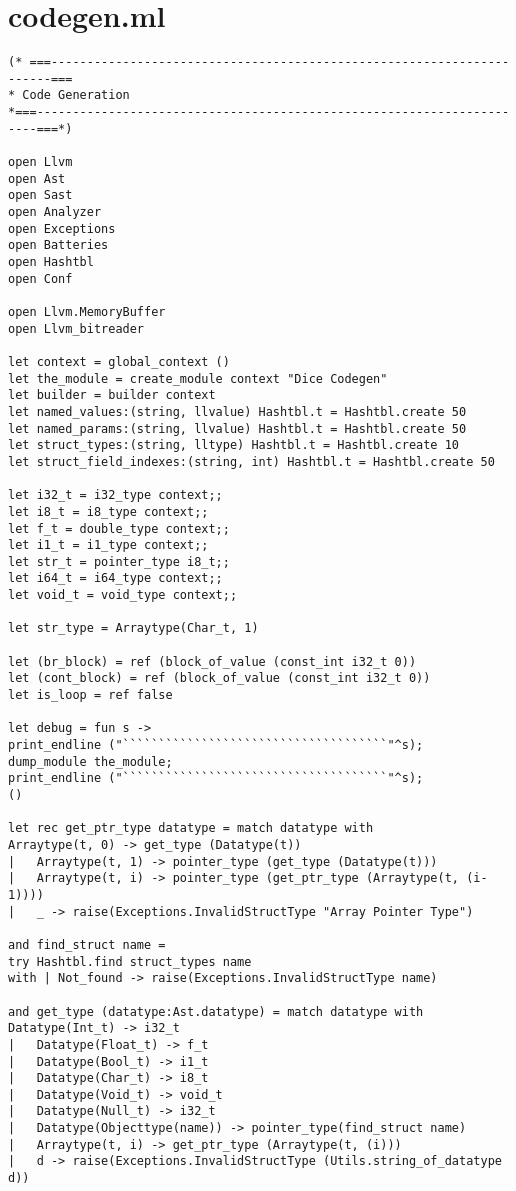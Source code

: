 \section{codegen.ml}
\begin{verbatim}
(* ===----------------------------------------------------------------------===
* Code Generation
*===----------------------------------------------------------------------===*)

open Llvm
open Ast
open Sast
open Analyzer
open Exceptions
open Batteries
open Hashtbl
open Conf

open Llvm.MemoryBuffer
open Llvm_bitreader

let context = global_context ()
let the_module = create_module context "Dice Codegen"
let builder = builder context
let named_values:(string, llvalue) Hashtbl.t = Hashtbl.create 50
let named_params:(string, llvalue) Hashtbl.t = Hashtbl.create 50
let struct_types:(string, lltype) Hashtbl.t = Hashtbl.create 10
let struct_field_indexes:(string, int) Hashtbl.t = Hashtbl.create 50

let i32_t = i32_type context;;
let i8_t = i8_type context;;
let f_t = double_type context;;
let i1_t = i1_type context;;
let str_t = pointer_type i8_t;;
let i64_t = i64_type context;;
let void_t = void_type context;;

let str_type = Arraytype(Char_t, 1)

let (br_block) = ref (block_of_value (const_int i32_t 0))
let (cont_block) = ref (block_of_value (const_int i32_t 0))
let is_loop = ref false

let debug = fun s ->  
print_endline ("`````````````````````````````````````"^s);
dump_module the_module;
print_endline ("`````````````````````````````````````"^s);
()

let rec get_ptr_type datatype = match datatype with
Arraytype(t, 0) -> get_type (Datatype(t))
|	Arraytype(t, 1) -> pointer_type (get_type (Datatype(t)))
|	Arraytype(t, i) -> pointer_type (get_ptr_type (Arraytype(t, (i-1))))
| 	_ -> raise(Exceptions.InvalidStructType "Array Pointer Type")

and find_struct name = 
try Hashtbl.find struct_types name
with | Not_found -> raise(Exceptions.InvalidStructType name)

and get_type (datatype:Ast.datatype) = match datatype with 
Datatype(Int_t) -> i32_t
| 	Datatype(Float_t) -> f_t
| 	Datatype(Bool_t) -> i1_t
| 	Datatype(Char_t) -> i8_t
| 	Datatype(Void_t) -> void_t
| 	Datatype(Null_t) -> i32_t
| 	Datatype(Objecttype(name)) -> pointer_type(find_struct name)
| 	Arraytype(t, i) -> get_ptr_type (Arraytype(t, (i)))
| 	d -> raise(Exceptions.InvalidStructType (Utils.string_of_datatype d)) 


\end{verbatim}
